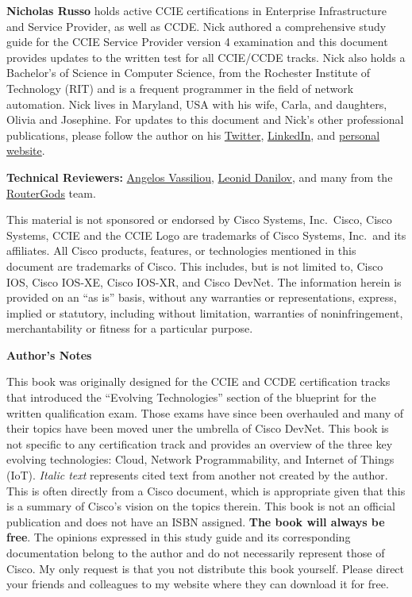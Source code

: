\noindent
\textbf{Nicholas Russo} holds active CCIE certifications in Enterprise
Infrastructure and Service Provider, as well as CCDE\@. Nick authored a
comprehensive study guide for the CCIE Service Provider version 4 examination
and this document provides updates to the written test for all CCIE/CCDE tracks.
Nick also holds a Bachelor’s of Science in Computer Science, from the Rochester
Institute of Technology (RIT) and is a frequent programmer in the field of
network automation. Nick lives in Maryland, USA with his wife, Carla, and
daughters, Olivia and Josephine. For updates to this document and Nick’s other
professional publications, please follow the author on his
\href{https://twitter.com/nickrusso42518}{Twitter},
\href{https://www.linkedin.com/in/njrusmc}{LinkedIn}, and
\href{http://njrusmc.net}{personal website}.


\textbf{Technical Reviewers:}
\href{https://twitter.com/ipmess}{Angelos Vassiliou},
\href{https://twitter.com/iosxrqna}{Leonid Danilov}, and many from the
\href{https://www.meetup.com/routergods}{RouterGods} team.

This material is not sponsored or endorsed by Cisco Systems, Inc.\ Cisco, Cisco
Systems, CCIE and the CCIE Logo are trademarks of Cisco Systems, Inc.\ and its
affiliates. All Cisco products, features, or technologies mentioned in this
document are trademarks of Cisco. This includes, but is not limited to, Cisco
IOS, Cisco IOS-XE, Cisco IOS-XR, and Cisco DevNet. The information herein is
provided on an ``as is'' basis, without any warranties or representations,
express, implied or statutory, including without limitation, warranties of
noninfringement, merchantability or fitness for a particular purpose.

\textbf{Author’s Notes}

This book was originally designed for the CCIE and CCDE certification tracks that
introduced the ``Evolving Technologies'' section of the blueprint for the written
qualification exam. Those exams have since been overhauled and many of their
topics have been moved uner the umbrella of Cisco DevNet.
This book is not specific to any certification track and provides
an overview of the three key evolving technologies: Cloud, Network
Programmability, and Internet of Things (IoT). \textit{Italic text} represents
cited text from another not created by the author. This is often directly
from a Cisco document, which is appropriate given that this is a summary of
Cisco’s vision on the topics therein. This book is not an official
publication and does not have an ISBN assigned. \textbf{The book will always be free}.
The opinions expressed in this study guide and its corresponding documentation
belong to the author and do not necessarily represent those of Cisco. My only
request is that you not distribute this book yourself. Please direct your
friends and colleagues to my website where they can download it for free.

